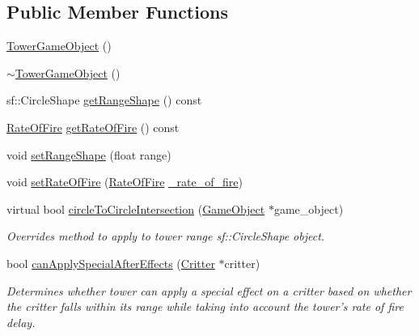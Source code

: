 \subsection*{Public Member Functions}
\begin{DoxyCompactItemize}
\item 
\hyperlink{class_tower_game_object_ae587eca041adf51c144a376564fac17e}{Tower\+Game\+Object} ()
\item 
\hyperlink{class_tower_game_object_a87241c8025188b610e3fb520608a85fa}{$\sim$\+Tower\+Game\+Object} ()
\item 
sf\+::\+Circle\+Shape \hyperlink{class_tower_game_object_a0e49616a6bb7cea91b45288a886e7e8e}{get\+Range\+Shape} () const 
\item 
\hyperlink{class_tower_game_object_a6a687237ad352e41acb35f8b4cf25fa3}{Rate\+Of\+Fire} \hyperlink{class_tower_game_object_a176b325a7415c42dd368a958d52f912c}{get\+Rate\+Of\+Fire} () const 
\item 
void \hyperlink{class_tower_game_object_a9e83986372f5cba1f6788d61c27c52f7}{set\+Range\+Shape} (float range)
\item 
void \hyperlink{class_tower_game_object_a44938da9215d2552043ddc7b35067be0}{set\+Rate\+Of\+Fire} (\hyperlink{class_tower_game_object_a6a687237ad352e41acb35f8b4cf25fa3}{Rate\+Of\+Fire} \hyperlink{class_tower_game_object_a791d99099306673e85ed6b93fd6f7b1b}{\+\_\+rate\+\_\+of\+\_\+fire})
\item 
virtual bool \hyperlink{class_tower_game_object_a824c0212a0c2958d9facfa97947c7332}{circle\+To\+Circle\+Intersection} (\hyperlink{class_game_object}{Game\+Object} $\ast$game\+\_\+object)
\begin{DoxyCompactList}\small\item\em Overrides method to apply to tower range sf\+::\+Circle\+Shape object. \end{DoxyCompactList}\item 
bool \hyperlink{class_tower_game_object_a92b1f8a95c7792bd9924d4f1286e3ddb}{can\+Apply\+Special\+After\+Effects} (\hyperlink{class_critter}{Critter} $\ast$critter)
\begin{DoxyCompactList}\small\item\em Determines whether tower can apply a special effect on a critter based on whether the critter falls within its range while taking into account the tower's rate of fire delay. \end{DoxyCompactList}\end{DoxyCompactItemize}
